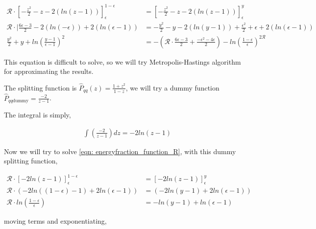 \documentclass[main.tex]{subfiles}
\begin{document}
\begin{align}
    \mathcal{R} \cdot \left[-\frac{z^2}{2} - z - 2\left( ln(z-1)\right) \right]_\epsilon^{1-\epsilon} &= \left[-\frac{z^2}{2} - z - 2\left( ln(z-1)\right) \right]_\epsilon^{y} \nonumber \\
    \mathcal{R}\cdot|  \frac{6 \epsilon-3}{2} - 2 ( ln(-\epsilon)) + 2 ( ln(\epsilon-1)) &= -\frac{y^2}{2} - y - 2 ( ln(y-1)) +\frac{\epsilon^2}{2} + \epsilon + 2 ( ln(\epsilon-1)) \nonumber\\
    \frac{y^2}{2} + y + ln \left( \frac{y-1}{\epsilon-1}\right)^2  &= -\left(\mathcal{R} \cdot \frac{6 \epsilon-3}{2} + \frac{-\epsilon^2-4 \epsilon}{2}\right) - ln\left(\frac{1-\epsilon}{\epsilon}\right)^{2\mathcal{R}}
\end{align}

This equation is difficult to solve, so we will try Metropolis-Hastings algorithm for approximating the results.

The \qqg splitting function is \(\hat{P}_{qq}(z) = \frac{1+z^2}{1-z}\), we will try a dummy function \(\hat{P}_{qq \text{dummy}} = \frac{-2}{z-1}\).

The integral is simply,

\begin{align}
    \int(\frac{-2}{z-1})dz = -2 ln(z-1)
\end{align}

Now we will try to solve \autoref{eqn: energyfraction_function_R}, with this dummy splitting function, 

\begin{align}
    \mathcal{R}\cdot \left[-2 ln(z-1)\right]_{\epsilon}^{1-\epsilon} &= \left[-2 ln(z-1)\right]_{\epsilon}^{y} \nonumber \\
    \mathcal{R}\cdot \left(-2 ln((1-\epsilon)-1) + 2 ln(\epsilon-1) \right) &= \left(-2 ln(y-1) + 2 ln(\epsilon-1) \right) \nonumber \\
    \mathcal{R}\cdot ln\left(\frac{1-\epsilon}{\epsilon} \right) &= - ln(y-1) + ln(\epsilon-1)
\end{align}

moving terms and exponentiating, 
\end{document}
